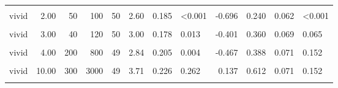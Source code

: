\documentclass[
]{article}
\begin{document}
\begin{longtable}[t]{lrrrrrrlrrrl}
\hspace{1em}\cellcolor{gray!10}{vivid} & \cellcolor{gray!10}{2.00} & \cellcolor{gray!10}{20} & \cellcolor{gray!10}{40} & \cellcolor{gray!10}{52} & \cellcolor{gray!10}{2.35} & \cellcolor{gray!10}{0.138} & \cellcolor{gray!10}{<0.001} & \cellcolor{gray!10}{-1.168} & \cellcolor{gray!10}{0.154} & \cellcolor{gray!10}{0.051} & \cellcolor{gray!10}{<0.001}\\
\hspace{1em}vivid & 2.00 & 50 & 100 & 50 & 2.60 & 0.185 & <0.001 & -0.696 & 0.240 & 0.062 & <0.001\\
\hspace{1em}\cellcolor{gray!10}{vivid} & \cellcolor{gray!10}{3.00} & \cellcolor{gray!10}{10} & \cellcolor{gray!10}{30} & \cellcolor{gray!10}{52} & \cellcolor{gray!10}{2.87} & \cellcolor{gray!10}{0.190} & \cellcolor{gray!10}{0.002} & \cellcolor{gray!10}{-0.467} & \cellcolor{gray!10}{0.288} & \cellcolor{gray!10}{0.064} & \cellcolor{gray!10}{0.003}\\
\hspace{1em}vivid & 3.00 & 40 & 120 & 50 & 3.00 & 0.178 & 0.013 & -0.401 & 0.360 & 0.069 & 0.065\\
\hspace{1em}\cellcolor{gray!10}{vivid} & \cellcolor{gray!10}{4.00} & \cellcolor{gray!10}{20} & \cellcolor{gray!10}{80} & \cellcolor{gray!10}{53} & \cellcolor{gray!10}{3.32} & \cellcolor{gray!10}{0.201} & \cellcolor{gray!10}{0.331} & \cellcolor{gray!10}{-0.123} & \cellcolor{gray!10}{0.453} & \cellcolor{gray!10}{0.070} & \cellcolor{gray!10}{0.583}\\
\hspace{1em}vivid & 4.00 & 200 & 800 & 49 & 2.84 & 0.205 & 0.004 & -0.467 & 0.388 & 0.071 & 0.152\\
\hspace{1em}\cellcolor{gray!10}{vivid} & \cellcolor{gray!10}{10.00} & \cellcolor{gray!10}{40} & \cellcolor{gray!10}{400} & \cellcolor{gray!10}{52} & \cellcolor{gray!10}{3.83} & \cellcolor{gray!10}{0.197} & \cellcolor{gray!10}{0.094} & \cellcolor{gray!10}{0.232} & \cellcolor{gray!10}{0.635} & \cellcolor{gray!10}{0.068} & \cellcolor{gray!10}{0.070}\\
\hspace{1em}vivid & 10.00 & 300 & 3000 & 49 & 3.71 & 0.226 & 0.262 & 0.137 & 0.612 & 0.071 & 0.152\\
\hspace{1em}\cellcolor{gray!10}{vivid} & \cellcolor{gray!10}{15.00} & \cellcolor{gray!10}{20} & \cellcolor{gray!10}{300} & \cellcolor{gray!10}{49} & \cellcolor{gray!10}{3.45} & \cellcolor{gray!10}{0.226} & \cellcolor{gray!10}{0.883} & \cellcolor{gray!10}{-0.033} & \cellcolor{gray!10}{0.571} & \cellcolor{gray!10}{0.072} & \cellcolor{gray!10}{0.392}\\

\end{longtable}
\end{document}
